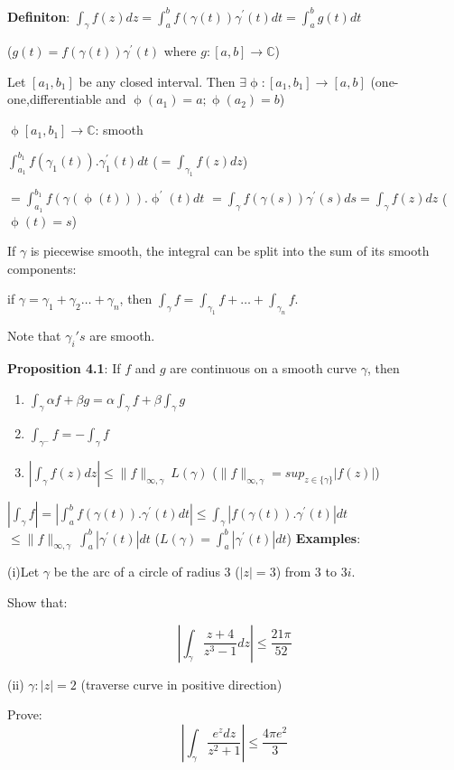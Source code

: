 \documentclass{article}
\begin{document}
\begin{flushleft}
\textbf{Definiton}: $\int_{\gamma}^{} f(z) dz= \int_{a}^{b} f(\gamma(t)) \gamma^{'}(t) dt=\int_{a}^{b}g(t) dt$ 

($g(t)=f(\gamma(t)) \gamma^{'}(t)$ where $g:[a,b]\rightarrow \mathds{C}$)

Let $[a_1,b_1]$ be any closed interval. Then $\exists \upphi:[a_1,b_1]\rightarrow [a,b]$ (one-one,differentiable and $\upphi(a_1)=a;\upphi(a_2)=b$)

$\upphi[a_1,b_1] \rightarrow \mathds{C}$: smooth 

$\int_{a_1}^{b_1}f(\gamma_1(t)).\gamma_1^{'}(t)dt$ \: ($=\int_{\gamma_1}^{}f(z) dz$)

$=\int_{a_1}^{b_1}f(\gamma(\upphi(t))).\upphi^{'}(t) dt$
$=\int_{\gamma}^{} f(\gamma(s)) \gamma^{'}(s) ds=\int_{\gamma}^{}f(z) dz$ \: ($\upphi(t)=s$)

If $\gamma$ is piecewise smooth, the integral can be split into the sum of its smooth components:

if $\gamma=\gamma_1+\gamma_2 \dots +\gamma_n$, then $\int_{\gamma}^{} f = \int_{\gamma_1}^{} f + \dots + \int_{\gamma_n}^{} f$.

Note that $\gamma_i's$ are smooth.

\textbf{Proposition 4.1}: If $f$ and $g$ are continuous on a smooth curve $\gamma$, then 
\begin{enumerate}
    \item $\int_{\gamma}^{} \alpha f+\beta g = \alpha \int_{\gamma}^{} f + \beta\int_{\gamma}^{} g$
    \item $\int_{\gamma^{-}}^{} f = - \int_{\gamma}^{} f$
    \item $|\int_{\gamma}^{} f(z) dz| \leq \|f\|_{\infty,\gamma} \: L(\gamma)$ \: ($\|f\|_{\infty,\gamma}=sup_{z\in \{\gamma\}}|f(z)|$)
\end{enumerate}

$|\int_{\gamma}^{} f|= |\int_{a}^{b} f(\gamma(t)).\gamma^{'}(t) dt| \leq \int_{\gamma}^{} |f(\gamma(t)).\gamma^{'}(t)| dt$
$\leq \|f\|_{\infty,\gamma}\:  \int_{a}^{b} |\gamma^{'}(t)| dt$   \: ($L(\gamma)=\int_{a}^{b} |\gamma^{'}(t)| dt$)
\textbf{Examples}: 

(i)Let $\gamma$ be the arc of a circle of radius 3 ($|z|=3$) from $3$ to $3i$.

Show that:

$$|\int_{\gamma}^{} \frac{z+4}{z^3-1} dz| \leq \frac{21\pi}{52}$$

(ii) $\gamma: |z|=2$  (traverse curve in positive direction)

Prove: $$|\int_{\gamma}^{} \frac{e^z dz}{z^2+1} | \leq \frac{4\pi e^2}{3}$$


\end{flushleft}
\end{document}
